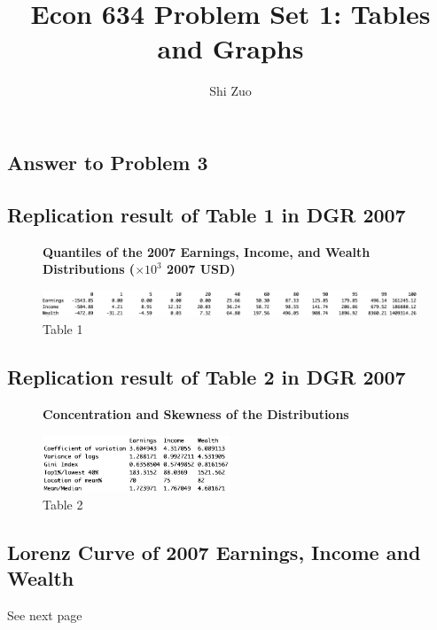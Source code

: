 \documentclass[11pt]{article}
\begin{document}
\author{Shi Zuo}
\title{Econ 634 Problem Set 1: Tables and Graphs}
\maketitle

\medskip

\begin{enumerate}
\section{Answer to Problem 3}
\subsection{Replication result of Table 1 in DGR 2007} 

\begin{figure}[h]
\centering
    \textbf{Quantiles of the 2007 Earnings, Income, and Wealth Distributions ($\times 10^3$ 2007 USD)}\par\medskip
	\includegraphics[width=\textwidth]{Table1.png}
\caption{Table 1}
	\label{fig:figure1}
	\end{figure}
	
	
\subsection{Replication result of Table 2 in DGR 2007} 

\begin{figure}[h]
\centering
    \textbf{Concentration and Skewness of the Distributions}\par\medskip
	\includegraphics[width=0.5\textwidth]{Table2.png}
\caption{Table 2}
	\label{fig:figure1}
	\end{figure}
\subsection{Lorenz Curve of 2007 Earnings, Income and Wealth}
See next page

\begin{figure}[t]
\centering
   

\end{figure}
\end{enumerate}
\end{document}
